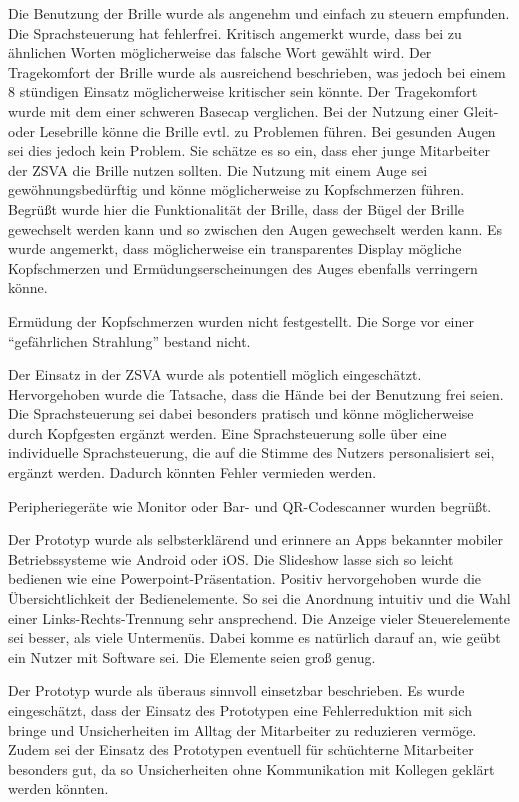 Die Benutzung der Brille wurde als angenehm und einfach zu steuern empfunden. Die Sprachsteuerung hat fehlerfrei. Kritisch angemerkt wurde, dass bei zu ähnlichen Worten möglicherweise das falsche Wort gewählt wird. Der Tragekomfort der Brille wurde als ausreichend beschrieben, was jedoch bei einem 8 stündigen Einsatz möglicherweise kritischer sein könnte. Der Tragekomfort wurde mit dem einer schweren Basecap verglichen. Bei der Nutzung einer Gleit- oder Lesebrille könne die Brille evtl. zu Problemen führen. Bei gesunden Augen sei dies jedoch kein Problem. Sie schätze es so ein, dass eher junge Mitarbeiter der ZSVA die Brille nutzen sollten. Die Nutzung mit einem Auge sei gewöhnungsbedürftig und könne möglicherweise zu Kopfschmerzen führen. Begrüßt wurde hier die Funktionalität der Brille, dass der Bügel der Brille gewechselt werden kann und so zwischen den Augen gewechselt werden kann. Es wurde angemerkt, dass möglicherweise ein transparentes Display mögliche Kopfschmerzen und Ermüdungserscheinungen des Auges ebenfalls verringern könne.

Ermüdung der Kopfschmerzen wurden nicht festgestellt. Die Sorge vor einer \enquote{gefährlichen Strahlung} bestand nicht.

Der Einsatz in der ZSVA wurde als potentiell möglich eingeschätzt. Hervorgehoben wurde die Tatsache, dass die Hände bei der Benutzung frei seien. Die Sprachsteuerung sei dabei besonders pratisch und könne möglicherweise durch Kopfgesten ergänzt werden. Eine Sprachsteuerung solle über eine individuelle Sprachsteuerung, die auf die Stimme des Nutzers personalisiert sei, ergänzt werden. Dadurch könnten Fehler vermieden werden.

Peripheriegeräte wie Monitor oder Bar- und QR-Codescanner wurden begrüßt.

Der Prototyp wurde als selbsterklärend und erinnere an Apps bekannter mobiler  Betriebssysteme wie Android oder iOS. Die Slideshow lasse sich so leicht bedienen wie eine Powerpoint-Präsentation. Positiv hervorgehoben wurde die Übersichtlichkeit der Bedienelemente. So sei die Anordnung intuitiv und die Wahl einer Links-Rechts-Trennung sehr ansprechend. Die Anzeige vieler Steuerelemente sei besser, als viele Untermenüs. Dabei komme es natürlich darauf an, wie geübt ein Nutzer mit Software sei. Die Elemente seien groß genug. 

Der Prototyp wurde als überaus sinnvoll einsetzbar beschrieben. Es wurde eingeschätzt, dass der Einsatz des Prototypen eine Fehlerreduktion mit sich bringe und Unsicherheiten im Alltag der Mitarbeiter zu reduzieren vermöge. Zudem sei der Einsatz des Prototypen eventuell für schüchterne Mitarbeiter besonders gut, da so Unsicherheiten ohne Kommunikation mit Kollegen geklärt werden könnten.

